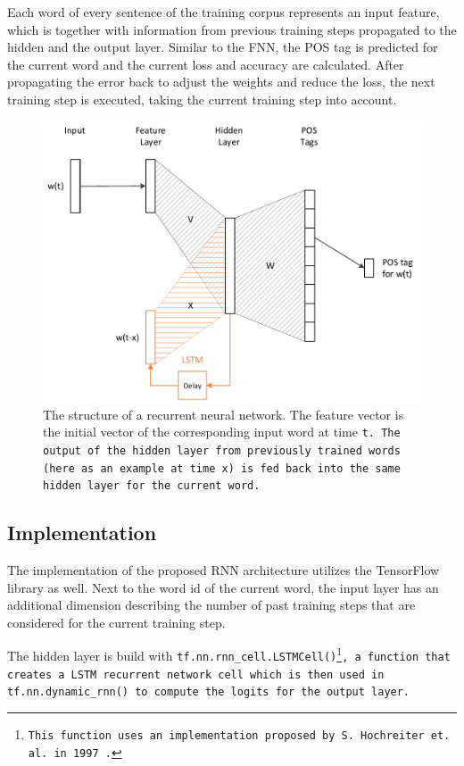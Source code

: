 Each word of every sentence of the training corpus represents an input feature, which is together with information from previous training steps propagated to the hidden and the output layer. Similar to the FNN, the POS tag is predicted for the current word and the current loss and accuracy are calculated. After propagating the error back to adjust the weights and reduce the loss, the next training step is executed, taking the current training step into account.

\begin{figure}[ht]
	\includegraphics[width=\textwidth]{images/rnn_structure}
	\caption[Structure of a Recurrent Neural Network]{The structure of a recurrent neural network. The feature vector is the initial vector of the corresponding input word at time \tt{t}. The output of the hidden layer from previously trained words (here as an example at time \tt{x}) is fed back into the same hidden layer for the current word.}
	\label{f.rnn.structure}
\end{figure}

\subsection{Implementation}\label{c.postagging.rnn.implementation}
The implementation of the proposed RNN architecture utilizes the TensorFlow library as well. Next to the word id of the current word, the input layer has an additional dimension describing the number of past training steps that are considered for the current training step.

The hidden layer is build with \tt{tf.nn.rnn\_cell.LSTMCell()}\footnote{This function uses an implementation proposed by S. Hochreiter et. al. in 1997 \cite{hochreiter1997}.}, a function that creates a LSTM recurrent network cell which is then used in \tt{tf.nn.dynamic\_rnn()} to compute the logits for the output layer.

